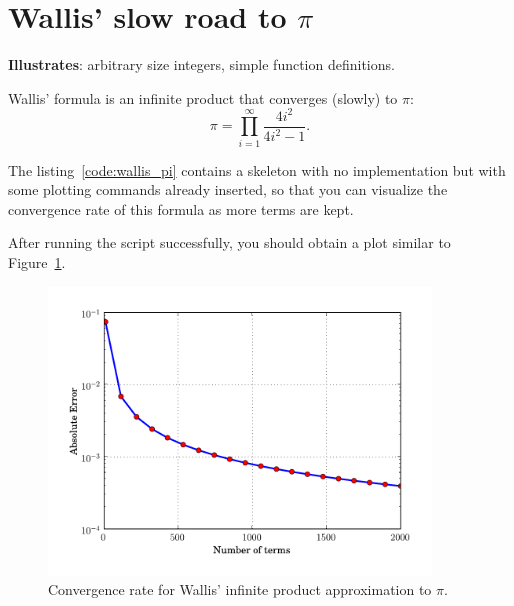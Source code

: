 \section{Wallis' slow road to $\pi$}

\textbf{Illustrates}: arbitrary size integers, simple function definitions.

Wallis' formula is an infinite product that converges (slowly) to
$\pi$:\begin{equation}
\pi=\prod_{i=1}^{\infty}\frac{4i^{2}}{4i^{2}-1}.\end{equation}


The listing~\ref{code:wallis_pi} contains a skeleton with no
implementation but with some plotting commands already inserted, so
that you can visualize the convergence rate of this formula as more
terms are kept.



After running the script successfully, you should obtain a plot similar
to Figure~\ref{fig:wallis_pi}.

\begin{center}%
\begin{figure}
\begin{centering}\includegraphics[width=4in]{fig/wallis_pi_convergence}\par\end{centering}


\caption{\label{fig:wallis_pi}Convergence rate for Wallis' infinite product
approximation to $\pi.$}
\end{figure}
\par\end{center}
